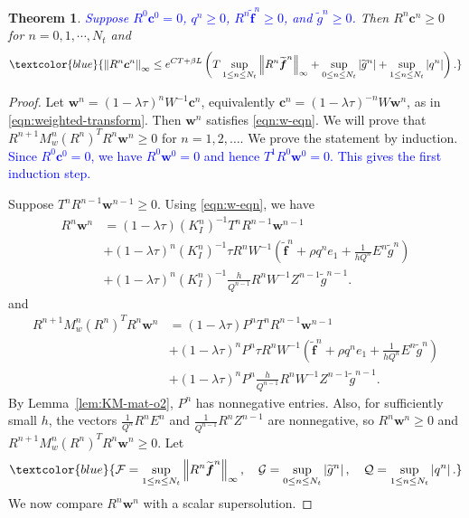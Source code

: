 \documentclass[11pt,reqno]{amsart}
\theoremstyle{plain}
\newtheorem{theorem}{Theorem}[section]
\theoremstyle{definition}
\numberwithin{equation}{section}
\newcommand{\paren}[1]{\left(#1\right)}
\newcommand{\wt}[1]{\widetilde{#1}}
\newcommand{\bm}[1]{\boldsymbol{#1}}
\newcommand{\abs}[1]{\left\lvert #1 \right\rvert}
\newcommand{\norm}[1]{\left\lVert #1 \right\rVert}
\begin{document}
\begin{theorem}\label{thm:mp-o2}
\textcolor{blue}{Suppose $R^0\bm c^0=0$, $q^n \ge 0$, $R^n\wt{\bm f}^n\ge 0$, and $\wt g^n\ge 0$.}
Then $R^n \bm c^n \ge 0$ for $n=0,1,\cdots, N_t$ and
\begin{equation}
    \textcolor{blue}{\norm{R^n\bm c^n}_\infty
    \le e^{CT+\beta L}\paren{
    T\sup_{1\le n\le N_t}\norm{R^n\wt{\bm f}^n}_\infty
    +\sup_{0\le n\le N_t}\abs{\wt g^n}
    +\sup_{1\le n\le N_t}\abs{q^n}}.}
\end{equation}
\end{theorem}
\begin{proof}
Let $\bm w^n=(1-\lambda\tau)^nW^{-1}\bm c^n$, equivalently
$\bm c^n = \paren{1-\lambda\tau}^{-n}W\bm w^n$, as in
\eqref{eqn:weighted-transform}. Then $\bm w^n$ satisfies
\eqref{eqn:w-eqn}.
We will prove that $R^{n+1}M_w^n(R^n)^TR^n \bm w^n \ge 0$ for $n=1,2,\dots$.
We prove the statement by induction.
\textcolor{blue}{Since $R^0\bm c^0=0$, we have $R^0\bm w^0=0$ and hence
$T^1R^0\bm w^0=0$. This gives the first induction step.}

Suppose $T^n R^{n-1}\bm w^{n-1} \ge 0$. Using \eqref{eqn:w-eqn}, we have
\begin{equation}
\begin{aligned}
     R^n \bm w^n &=  (1-\lambda \tau)(K_I^n)^{-1}T^n R^{n-1} \bm w^{n-1} \\
     &+ (1-\lambda \tau)^{n} (K_I^n)^{-1}\tau  R^nW^{-1} \paren{ \wt{\bm f}^n + \rho q^n e_1+ \frac{1}{h Q^n}  E^n \wt g^n} \\
    &+ (1-\lambda \tau)^{n}(K_I^n)^{-1} \frac{h}{Q^{n-1}} R^n W^{-1}Z^{n-1} \wt g^{n-1}.
\end{aligned}
\end{equation}
and
\begin{equation}
\begin{aligned}
     R^{n+1}M_w^n(R^n)^TR^n \bm w^n &=  (1-\lambda \tau)P^nT^n R^{n-1} \bm w^{n-1} \\
     &+(1-\lambda \tau)^{n} P^n\tau  R^nW^{-1}  \paren{ \wt{\bm f}^n + \rho q^n e_1+ \frac{1}{h Q^n}  E^n \wt g^n} \\
    &+(1-\lambda \tau)^{n} P^n \frac{h}{Q^{n-1}} R^n W^{-1}Z^{n-1} \wt g^{n-1}.
\end{aligned}
\end{equation}
By Lemma~\ref{lem:KM-mat-o2}, $P^n$ has nonnegative entries. Also, for sufficiently small $h$, the vectors $\frac{1}{Q^n}R^n E^n$ and $\frac{1}{Q^{n-1}}R^nZ^{n-1}$ are nonnegative, so $R^n\bm w^n \ge 0$ and $R^{n+1}M_w^n(R^n)^TR^n \bm w^n \ge 0$.
Let
\begin{align}
    \textcolor{blue}{\mathcal{F} = \sup_{1\le n\le N_t}
    \norm{R^n\wt{\bm f}^n}_\infty,\quad
    \mathcal{G}=\sup_{0\le n\le N_t}\abs{\wt g^n},\quad
    \mathcal{Q} = \sup_{1\le n\le N_t}\abs{q^n}.}
\end{align}
We now compare $R^n\bm w^n$ with a scalar supersolution.


\end{proof}
\end{document}
